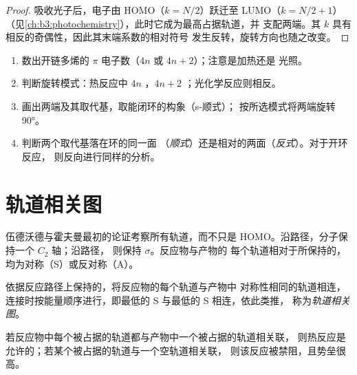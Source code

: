 \begin{proof}
吸收光子后，电子由 HOMO（$k = N/2$）跃迁至 LUMO（$k = N/2 + 1$）
（见\cref{ch:b3:photochemistry}），此时它成为最高占据轨道，并
支配两端。其 $k$ 具有相反的奇偶性，因此其末端系数的相对符号
发生反转，旋转方向也随之改变。
\end{proof}

\begin{method}[预测电环化反应的立体化学]\label{met:b3:pericyclic:predict-stereo}
\begin{enumerate}
  \item 数出开链多烯的 $\pi$ 电子数（$4n$ 或 $4n + 2$）；注意是加热还是
        光照。
  \item 判断旋转模式：热反应中 $4n$ ，$4n + 2$ ；光化学反应则相反。
  \item 画出两端及其取代基，取能闭环的构象（s-顺式）；
        按所选模式将两端旋转 90°。
  \item 判断两个取代基落在环的同一面
        （\textit{顺式}）还是相对的两面（\textit{反式}）。对于开环反应，
        则反向进行同样的分析。
\end{enumerate}
\end{method}

\section{轨道相关图}

伍德沃德与霍夫曼最初的论证考察所有轨道，而不只是
HOMO。沿路径，分子保持一个 $C_2$ 轴；沿路径，
则保持 $\sigma$。反应物与产物的
每个轨道相对于所保持的，
均为对称（S）或反对称（A）。

\begin{definition}[轨道相关图]\label{def:b3:pericyclic:orbital-correlation}
依据反应路径上保持的，将反应物的每个轨道与产物中
对称性相同的轨道相连，
连接时按能量顺序进行，即最低的 S 与最低的 S 相连，依此类推，
称为\emph{轨道相关图}。
\end{definition}

\begin{proposition}[轨道对称性守恒]\label{prop:b3:pericyclic:correlation}
若反应物中每个被占据的轨道都与产物中一个被占据的轨道相关联，
则热反应是允许的；若某个被占据的轨道与一个空轨道相关联，
则该反应被禁阻，且势垒很高。
\end{proposition}

